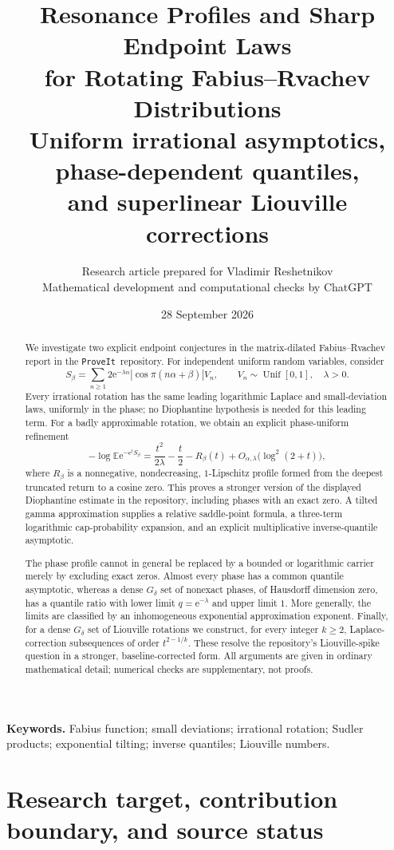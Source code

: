 \documentclass[11pt,a4paper]{article}
\title{\textbf{Resonance Profiles and Sharp Endpoint Laws\\
for Rotating Fabius--Rvachev Distributions}\\[0.55em]
\large Uniform irrational asymptotics, phase-dependent quantiles,\\
and superlinear Liouville corrections}
\author{Research article prepared for Vladimir Reshetnikov\\
\small Mathematical development and computational checks by ChatGPT}
\date{28 September 2026}
\theoremstyle{definition}
\theoremstyle{remark}\newtheorem{remark}[theorem]{Remark}
\newcommand{\EE}{\mathbb E}
\newcommand{\Unif}{\operatorname{Unif}}
\newcommand{\e}{\mathrm e}
\newcommand{\repo}{\texttt{ProveIt}}
\begin{document}
\maketitle
\begin{abstract}
We investigate two explicit endpoint conjectures in the matrix-dilated
Fabius--Rvachev report in the \repo\ repository.  For independent uniform
random variables, consider
\[
 S_\beta=\sum_{n\ge1}2\e^{-\lambda n}
       |\cos\pi(n\alpha+\beta)|V_n,
 \qquad V_n\sim\Unif[0,1],\quad \lambda>0.
\]
Every irrational rotation has the same leading logarithmic Laplace and
small-deviation laws, uniformly in the phase; no Diophantine hypothesis is
needed for this leading term.  For a badly approximable rotation, we obtain
an explicit phase-uniform refinement
\[
 -\log\EE\e^{-\e^tS_\beta}
 =\frac{t^2}{2\lambda}-\frac t2-R_\beta(t)
   +O_{\alpha,\lambda}\!\bigl(\log^2(2+t)\bigr),
\]
where $R_\beta$ is a nonnegative, nondecreasing, $1$-Lipschitz profile formed
from the deepest truncated return to a cosine zero.  This proves a stronger
version of the displayed Diophantine estimate in the repository, including
phases with an exact zero.  A tilted gamma approximation supplies a relative
saddle-point formula, a three-term logarithmic cap-probability expansion,
and an explicit multiplicative inverse-quantile asymptotic.

The phase profile cannot in general be replaced by a bounded or logarithmic
carrier merely by excluding exact zeros.  Almost every phase has a common
quantile asymptotic, whereas a dense $G_\delta$ set of nonexact phases, of
Hausdorff dimension zero, has a quantile ratio with lower limit
$q=\e^{-\lambda}$ and upper limit $1$.  More generally, the limits are
classified by an inhomogeneous exponential approximation exponent.  Finally,
for a dense $G_\delta$ set of Liouville rotations we construct, for every
integer $k\ge2$, Laplace-correction subsequences of order
$t^{2-1/k}$.  These resolve the repository's Liouville-spike question in a
stronger, baseline-corrected form.  All arguments are given in ordinary
mathematical detail; numerical checks are supplementary, not proofs.
\end{abstract}
\vspace{0.3em}
\noindent\textbf{Keywords.} Fabius function; small deviations; irrational rotation;
Sudler products; exponential tilting; inverse quantiles; Liouville numbers.

\clearpage
\tableofcontents
\clearpage

\section{Research target, contribution boundary, and source status}
\label{sec:scope}
\end{document}
